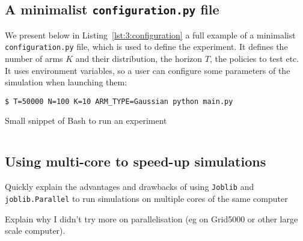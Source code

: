     \inputminted[linenos=true,numbersep=5pt,frame=lines,framesep=2mm]{python3}{2-Chapters/3-Chapter/src/example_of_main_singleplayer.py}


\subsection{A minimalist \texttt{configuration.py} file}

We present below in Listing~\ref{lst:3:configuration} a full example of a minimalist \texttt{configuration.py} file,
which is used to define the experiment.
It defines the number of arms $K$ and their distribution, the horizon $T$, the policies to test etc.
It uses environment variables, so a user can configure some parameters of the simulation when launching them:


\begin{listing}[h!]
    \begin{verbatim}
$ T=50000 N=100 K=10 ARM_TYPE=Gaussian python main.py
    \end{verbatim}
    \caption{Small snippet of Bash to run an experiment}
    \label{lst:3:howToRunExperiment2}
\end{listing}

    \inputminted[linenos=true,numbersep=5pt,frame=lines,framesep=2mm]{python3}{2-Chapters/3-Chapter/src/example_of_configuration_singleplayer.py}


\subsection{Using multi-core to speed-up simulations}


Quickly explain the advantages and drawbacks of using \texttt{Joblib} and \texttt{joblib.Parallel} to run simulations on multiple cores of the same computer

Explain why I didn't try more on parallelisation (eg on Grid5000 or other large scale computer).

